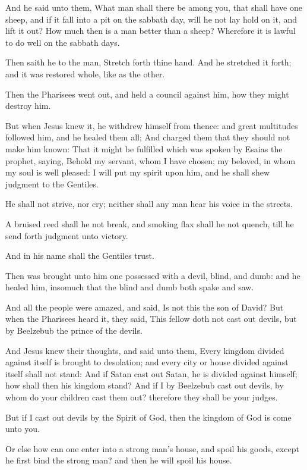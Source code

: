 \Verse And he said unto them, What man shall there be among you, that shall have one sheep, and if it fall into a pit on the sabbath day, will he not lay hold on it, and lift it out?  \Verse How much then is a man better than a sheep? Wherefore it is lawful to do well on the sabbath days.

\Verse Then saith he to the man, Stretch forth thine hand. And he stretched it forth; and it was restored whole, like as the other.

\Verse Then the Pharisees went out, and held a council against him, how they might destroy him.

\Verse But when Jesus knew it, he withdrew himself from thence: and great multitudes followed him, and he healed them all; \Verse And charged them that they should not make him known: \Verse That it might be fulfilled which was spoken by Esaias the prophet, saying, \Verse Behold my servant, whom I have chosen; my beloved, in whom my soul is well pleased: I will put my spirit upon him, and he shall shew judgment to the Gentiles.

\Verse He shall not strive, nor cry; neither shall any man hear his voice in the streets.

\Verse A bruised reed shall he not break, and smoking flax shall he not quench, till he send forth judgment unto victory.

\Verse And in his name shall the Gentiles trust.

\Verse Then was brought unto him one possessed with a devil, blind, and dumb: and he healed him, insomuch that the blind and dumb both spake and saw.

\Verse And all the people were amazed, and said, Is not this the son of David?  \Verse But when the Pharisees heard it, they said, This fellow doth not cast out devils, but by Beelzebub the prince of the devils.

\Verse And Jesus knew their thoughts, and said unto them, Every kingdom divided against itself is brought to desolation; and every city or house divided against itself shall not stand: \Verse And if Satan cast out Satan, he is divided against himself; how shall then his kingdom stand?  \Verse And if I by Beelzebub cast out devils, by whom do your children cast them out? therefore they shall be your judges.

\Verse But if I cast out devils by the Spirit of God, then the kingdom of God is come unto you.

\Verse Or else how can one enter into a strong man's house, and spoil his goods, except he first bind the strong man? and then he will spoil his house.

